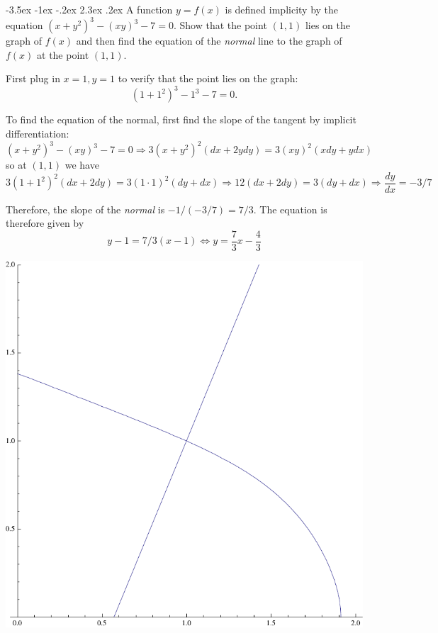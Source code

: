 \documentclass[10pt]{article}
\makeatletter
\renewcommand\section{\@startsection{section}{1}{\z@}%
                                  {-3.5ex \@plus -1ex \@minus -.2ex}%
                                  {2.3ex \@plus.2ex}%
                                  {\normalfont\large\bfseries}}
\newcommand{\advsection}{\addtocounter{section}{1} }
\makeatother
\begin{document}

\advsection

\section{A function $y=f(x)$ is defined implicity by the equation $(x+y^2)^3 - (x y )^3 - 7 =0 $. Show that the point $(1,1)$ lies on the graph of $f(x)$ and then find the equation of the \emph{normal} line to the graph of $f(x)$ at the point $(1,1)$.}

First plug in $x=1, y=1$ to verify that the point lies on the graph:
\[(1 + 1^2)^3 - 1^3 - 7 =0.\]

To find the equation of the normal, first find the slope of the tangent by implicit differentiation:
\[(x+y^2)^3 - (x y )^3 - 7 =0  \Rightarrow 3(x+y^2)^2 (dx + 2 y dy)=3(x y)^2 (xdy + y dx) \]
so at $(1,1)$ we have 
\[3(1+1^2)^2 (dx + 2 dy)=3(1\cdot 1)^2 (dy + dx) \Rightarrow 12(dx + 2 dy) = 3 (dy + dx) \Rightarrow \frac{dy}{dx} = - 3/7\]

Therefore, the slope of the \emph{normal} is $-1/ (-3/7) = 7/3$. The equation is therefore given by 
\[y - 1 = 7/3(x - 1) \iff y = \frac{7}{3} x -\frac{4}{3} \]

\includegraphics{quiz2plot1}

\end{document}
